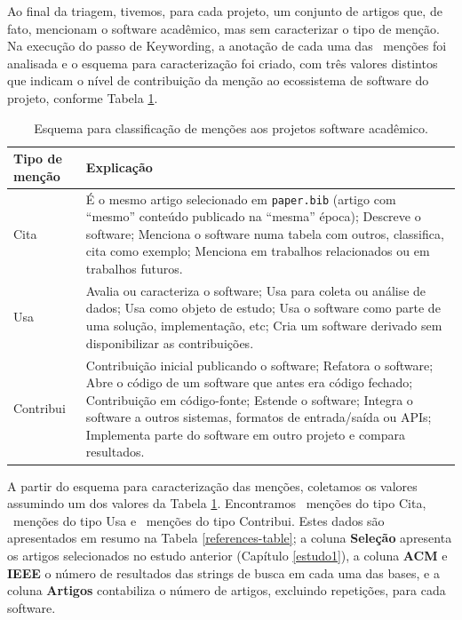 Ao final da triagem, tivemos, para cada projeto, um conjunto de artigos que, de
fato, mencionam o software acadêmico, mas sem caracterizar o tipo de menção.
Na execução do passo de Keywording, 
a anotação de cada uma das \ScreeningCount \ menções foi analisada e o
esquema para caracterização foi criado, com três valores distintos que
indicam o nível de contribuição da menção ao ecossistema de software do projeto,
conforme Tabela \ref{esquema-de-mencao}.

\begin{table}[h]
\caption{Esquema para classificação de menções aos projetos software acadêmico.}
\centering
\begin{tabular}{ l p{10cm} }
  \hline
  Tipo de menção           & Explicação \\
  \hline
  Cita      & É o mesmo artigo selecionado em \texttt{paper.bib} (artigo com ``mesmo'' conteúdo publicado na ``mesma'' época); Descreve o software; Menciona o software numa tabela com outros, classifica, cita como exemplo; Menciona em trabalhos relacionados ou em trabalhos futuros. \\
  Usa       & Avalia ou caracteriza o software; Usa para coleta ou análise de dados; Usa como objeto de estudo; Usa o software como parte de uma solução, implementação, etc; Cria um software derivado sem disponibilizar as contribuições. \\
  Contribui & Contribuição inicial publicando o software; Refatora o software; Abre o código de um software que antes era código fechado; Contribuição em código-fonte; Estende o software; Integra o software a outros sistemas, formatos de entrada/saída ou APIs; Implementa parte do software em outro projeto e compara resultados. \\
  \hline
\end{tabular}
\label{esquema-de-mencao}
\end{table}

A partir do esquema para caracterização das menções, coletamos os valores
assumindo um dos valores da Tabela \ref{esquema-de-mencao}. Encontramos
\CiteCount \ menções do tipo Cita, \UseCount \ menções do tipo Usa e
\ContributeCount \ menções do tipo Contribui. Estes dados são
apresentados em resumo na Tabela \ref{references-table};
a coluna {\bf Seleção} apresenta os artigos
selecionados no estudo anterior (Capítulo \ref{estudo1}), a coluna {\bf ACM} e
{\bf IEEE} o número de resultados das strings de busca em cada uma das bases, e
a coluna {\bf Artigos} contabiliza o número de artigos, excluindo
repetições, para cada software.

